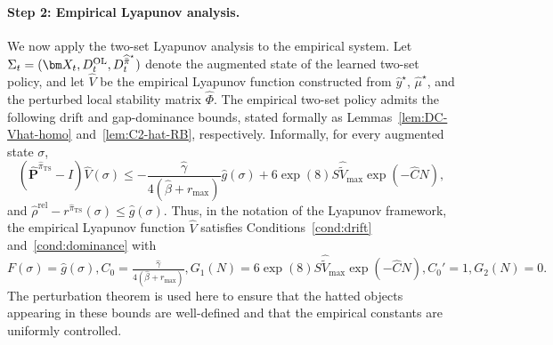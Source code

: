 \documentclass[mnsc,nonblindrev]{informs3}
\newcommand{\bphat}{\widehat{\bm{P}}}
\newcommand{\pihbst}{\widehat{\Bar{\pi}}^\star}
\newcommand{\pihts}{\widehat{\pi}_{\mathrm{TS}}}
\newcommand{\phihat}{\widehat{\Phi}}
\begin{document}
\paragraph{Step 2: Empirical Lyapunov analysis.}
We now apply the two-set Lyapunov analysis to the empirical system. Let
\(
    \Sigma_t
    =
    (\bm X_t,D_t^{\mathrm{OL}},D_t^{\pihbst})
\)
denote the augmented state of the learned two-set policy, and let
\(\widehat V\) be the empirical Lyapunov function constructed from
\(\widehat y^\star\), \(\widehat\mu^\star\), and the perturbed local
stability matrix $\phihat$. The empirical two-set policy admits the following drift and
gap-dominance bounds, stated formally as
Lemmas~\ref{lem:DC-Vhat-homo} and~\ref{lem:C2-hat-RB},
respectively. Informally, for every augmented state \(\sigma\),
\[
    (\bphat^{\pihts}-I)\widehat V(\sigma)
    \le
    -\frac{\widehat\gamma}
    {4(\widehat\beta+r_{\max})}
    \widehat g(\sigma)
    +
    6\exp(8)S\widehat{\widetilde V}_{\max}
    \exp(-\widehat C N),
\]
and
\(
    \widehat\rho^{\mathrm{rel}}-r^{\pihts}(\sigma)
    \le
    \widehat g(\sigma).
\)
Thus, in the notation of the Lyapunov framework, the empirical Lyapunov
function \(\widehat V\) satisfies Conditions~\ref{cond:drift}
and~\ref{cond:dominance} with
\(
    F(\sigma)=\widehat g(\sigma),
    C_0=\frac{\widehat\gamma}{4(\widehat\beta+r_{\max})},
    G_1(N)=6\exp(8)S\widehat{\widetilde V}_{\max}\exp(-\widehat C N),
    C_0'=1,
    G_2(N)=0.
\)
The perturbation theorem is used here to ensure that the hatted objects
appearing in these bounds are well-defined and that the empirical
constants are uniformly controlled.
\end{document}
